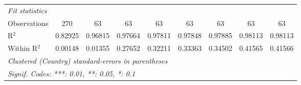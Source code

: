 \begin{table}[htbp]
\begin{tabular}{lcccccccc}
      \midrule
      \emph{Fit statistics}\\
      Observations                                                                    & 270      & 63       & 63              & 63              & 63              & 63              & 63              & 63\\  
      R$^2$                                                                           & 0.82925  & 0.96815  & 0.97664         & 0.97811         & 0.97848         & 0.97885         & 0.98113         & 0.98113\\  
      Within R$^2$                                                                    & 0.00148  & 0.01355  & 0.27652         & 0.32211         & 0.33363         & 0.34502         & 0.41565         & 0.41566\\  
      \midrule \midrule
      \multicolumn{9}{l}{\emph{Clustered (Country) standard-errors in parentheses}}\\
      \multicolumn{9}{l}{\emph{Signif. Codes: ***: 0.01, **: 0.05, *: 0.1}}\\
   \end{tabular}
\end{table}


